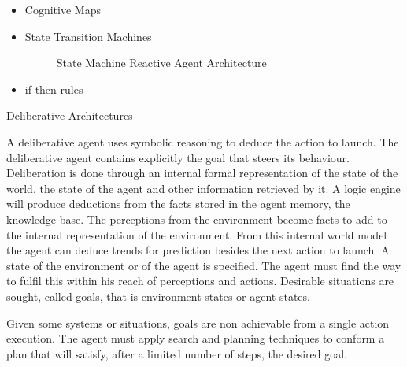 \documentclass[11pt,oneside,a4paper,openright]{report}
\begin{document}
\begin{description}
\begin{itemize}
		\item Cognitive Maps
		\item State Transition Machines %

		\begin{figure}[h]
		\centering
		\setlength\fboxsep{0pt}
		\setlength\fboxrule{0.5pt}
		\caption{State Machine Reactive Agent Architecture}
		\label{fig:StateMachine}
		\end{figure}

		\item if-then rules
	\end{itemize}
	
	\item Deliberative Architectures

	A deliberative agent uses symbolic reasoning to deduce the action to launch. The deliberative agent
	contains explicitly the goal that steers its behaviour. Deliberation is done through an internal formal 
	representation of the state of the world, the state of the agent and other information retrieved by
	it. A logic engine will produce deductions from the facts stored in the agent memory, the knowledge
	base. The perceptions from the environment become facts to add to the internal representation of
	the environment. From this internal world model the agent can deduce trends for prediction besides
	the next action to launch. A state of the environment or of the agent is specified. The agent must find 
	the way to fulfil this within his reach of perceptions and actions. Desirable situations are sought, 
	called goals, that is environment states or agent states. 

	Given some systems or situations, goals are non achievable from a single action execution. The agent 
	must apply search and planning techniques to conform a plan that will satisfy, after a limited number of 
	steps, the desired goal.


\end{description}
\end{document}
